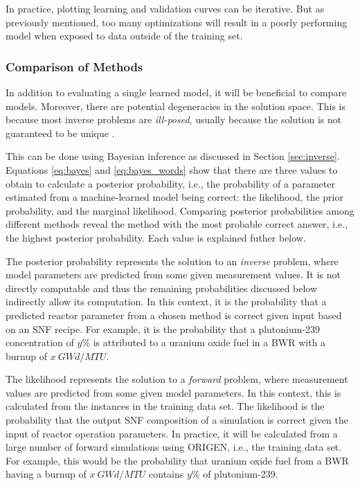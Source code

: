 In practice, plotting learning and validation curves can be iterative. But as
previously mentioned, too many optimizations will result in a poorly performing
model when exposed to data outside of the training set.

\subsubsection{Comparison of Methods}
\label{sec:invcompare}

In addition to evaluating a single learned model, it will be beneficial to
compare models. Moreover, there are potential degeneracies in the solution
space. This is because most inverse problems are \textit{ill-posed}, usually
because the solution is not guaranteed to be unique \cite{skutnik_2016}. 

This can be done using Bayesian inference as discussed in Section
\ref{sec:inverse}.  Equations \ref{eq:bayes} and \ref{eq:bayes_words} show that
there are three values to obtain to calculate a posterior probability, i.e., the
probability of a parameter estimated from a machine-learned model being correct:
the likelihood, the prior probability, and the marginal likelihood.  Comparing
posterior probabilities among different methods reveal the method with the most
probable correct answer, i.e., the highest posterior probability.
\cite{inverse_theory, gentle_bayes} Each value is explained futher below.

The posterior probability represents the solution to an \textit{inverse}
problem, where model parameters are predicted from some given measurement
values. It is not directly computable and thus the remaining probabilities
discussed below indirectly allow its computation.  In this context, it is the
probability that a predicted reactor parameter from a chosen method is correct
given input based on an \gls{SNF} recipe.  For example, it is the probability
that a plutonium-239 concentration of $y\%$ is attributed to a uranium oxide
fuel in a \gls{BWR} with a burnup of $x\ GWd/MTU$.  

The likelihood represents the solution to a \textit{forward} problem, where
measurement values are predicted from some given model parameters.  In this
context, this is calculated from the instances in the training data set.  The
likelihood is the probability that the output \gls{SNF} composition of a
simulation is correct given the input of reactor operation parameters.  In
practice, it will be calculated from a large number of forward simulations
using \gls{ORIGEN}, i.e., the training data set. For example, this would be the
probability that uranium oxide fuel from a \gls{BWR} having a burnup of $x\
GWd/MTU$ contains $y\%$ of plutonium-239.

